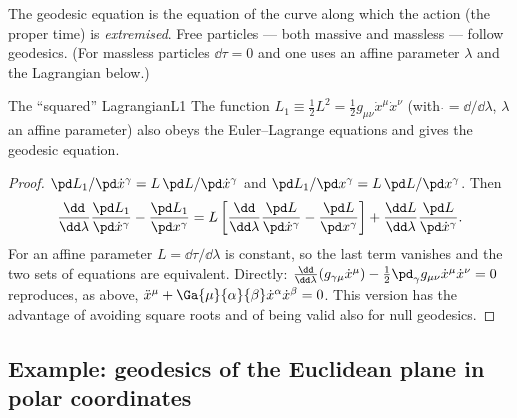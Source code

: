 \begin{keyresult}
The geodesic equation is the equation of the curve along which the action (the proper time) is \emph{extremised}. Free particles --- both massive and massless --- follow geodesics. (For massless particles $\dd\tau=0$ and one uses an affine parameter $\lambda$ and the Lagrangian below.)
\end{keyresult}

\begin{proposition}{The ``squared'' Lagrangian}{L1}
The function $L_1\equiv\frac12L^2=\frac12 g_{\mu\nu}\dot x^\mu\dot x^\nu$ (with $\dot{}=\dd/\dd\lambda$, $\lambda$ an affine parameter) also obeys the Euler--Lagrange equations and gives the geodesic equation.
\end{proposition}
\begin{proof}
$\pd L_1/\pd\dot x^\gamma=L\,\pd L/\pd\dot x^\gamma$ and $\pd L_1/\pd x^\gamma=L\,\pd L/\pd x^\gamma$. Then
\[
\frac{\dd}{\dd\lambda}\frac{\pd L_1}{\pd\dot x^\gamma}-\frac{\pd L_1}{\pd x^\gamma}=L\left[\frac{\dd}{\dd\lambda}\frac{\pd L}{\pd\dot x^\gamma}-\frac{\pd L}{\pd x^\gamma}\right]+\frac{\dd L}{\dd\lambda}\frac{\pd L}{\pd\dot x^\gamma}.
\]
For an affine parameter $L=\dd\tau/\dd\lambda$ is constant, so the last term vanishes and the two sets of equations are equivalent. Directly: $\frac{\dd}{\dd\lambda}(g_{\gamma\mu}\dot x^\mu)-\frac12\pd_\gamma g_{\mu\nu}\dot x^\mu\dot x^\nu=0$ reproduces, as above, $\ddot x^\mu+\Ga{\mu}{\alpha}{\beta}\dot x^\alpha\dot x^\beta=0$. This version has the advantage of avoiding square roots and of being valid also for null geodesics.
\end{proof}

\subsection{Example: geodesics of the Euclidean plane in polar coordinates}

